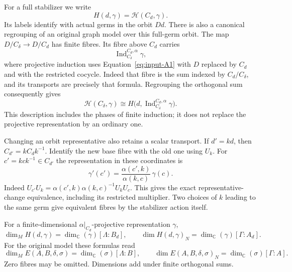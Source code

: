 For a full stabilizer we write
\[
 H(d,\gamma)=\mathcal H(C_d,\gamma).
\]
Its labels identify with actual germs in the orbit $Dd$.
There is also a canonical regrouping of an original graph model over
this full-germ orbit.  The map $D/C_\delta\to D/C_d$ has finite
fibres.  Its fibre above $C_d$ carries
\begin{equation}\label{eq:calculus-regrouping}
 \operatorname{Ind}^{C_d,\alpha}_{C_\delta}\gamma,
\end{equation}
where projective induction uses
Equation~\eqref{eq:input-A1} with $D$ replaced by $C_d$ and with the
restricted cocycle.  Indeed that fibre is the sum indexed by
$C_d/C_\delta$, and its transports are precisely that formula.
Regrouping the orthogonal sum consequently gives
\[
 \mathcal H(C_\delta,\gamma)
 \cong H\bigl(d,\operatorname{Ind}^{C_d,\alpha}_{C_\delta}\gamma\bigr).
\]
This description includes the phases of finite induction; it does not
replace the projective representation by an ordinary one.

Changing an orbit representative also retains a scalar transport.
If $d'=kd$, then $C_{d'}=kC_dk^{-1}$.  Identify the new base fibre
with the old one using $U_k$.  For $c'=kck^{-1}\in C_{d'}$ the
representation in these coordinates is
\begin{equation}\label{eq:calculus-representative-change}
 \gamma'(c')=
 \frac{\alpha(c',k)}{\alpha(k,c)}\,\gamma(c).
\end{equation}
Indeed $U_{c'}U_k=
\alpha(c',k)\alpha(k,c)^{-1}U_kU_c$.
This gives the exact representative-change equivalence, including its
restricted multiplier.  Two choices of $k$ leading to the same germ
give equivalent fibres by the stabilizer action itself.

\begin{proposition}
\label{prop:calculus-dimensions}
For a finite-dimensional $\alpha|_{C_d}$-projective representation
$\gamma$,
\begin{equation}\label{eq:calculus-full-dimensions}
 \dim_M H(d,\gamma)
   =\dim_{\mathbb C}(\gamma)[\Lambda:B_d],
 \qquad
 \dim H(d,\gamma)_N
   =\dim_{\mathbb C}(\gamma)[\Gamma:A_d].
\end{equation}
For the original model these formulas read
\[
 \dim_M E(A,B,\delta,\sigma)
   =\dim_{\mathbb C}(\sigma)[\Lambda:B],
 \qquad
 \dim E(A,B,\delta,\sigma)_N
   =\dim_{\mathbb C}(\sigma)[\Gamma:A].
\]
Zero fibres may be omitted.  Dimensions add under finite orthogonal
sums.
\end{proposition}

